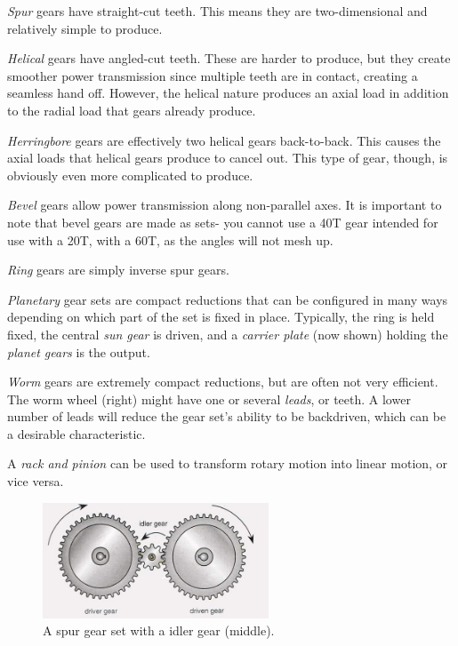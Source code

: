 \begin{asparaenum}[a)]
	\item \textit{Spur} gears have straight-cut teeth. This means they are two-dimensional and relatively simple to produce.
	\item \textit{Helical} gears have angled-cut teeth. These are harder to produce, but they create smoother power transmission since multiple teeth are in contact, creating a seamless hand off. However, the helical nature produces an axial load in addition to the radial load that gears already produce. 
	\item \textit{Herringbore} gears are effectively two helical gears back-to-back. This causes the axial loads that helical gears produce to cancel out. This type of gear, though, is obviously even more complicated to produce.
	\item \textit{Bevel} gears allow power transmission along non-parallel axes. It is important to note that bevel gears are made as sets- you cannot use a 40T gear intended for use with a 20T, with a 60T, as the angles will not mesh up.
	\item \textit{Ring} gears are simply inverse spur gears.
	\item \textit{Planetary} gear sets are compact reductions that can be configured in many ways depending on which part of the set is fixed in place. Typically, the ring is held fixed, the central \textit{sun gear} is driven, and a \textit{carrier plate} (now shown) holding the \textit{planet gears} is the output.
	\item \textit{Worm} gears are extremely compact reductions, but are often not very efficient. The worm wheel (right) might have one or several \textit{leads}, or teeth. A lower number of leads will reduce the gear set's ability to be backdriven, which can be a desirable characteristic.
	\item A \textit{rack and pinion} can be used to transform rotary motion into linear motion, or vice versa.	
\end{asparaenum}

\begin{figure}[H]
	\includegraphics[width=0.6\textwidth]{imgs/gearset_idler.jpeg}
	\caption{A spur gear set with a idler gear (middle).}
\end{figure}

